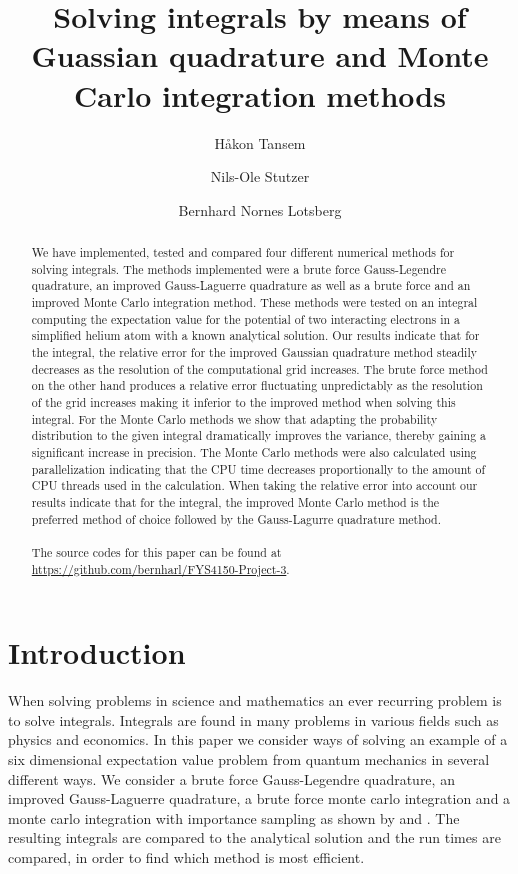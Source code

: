 \documentclass[10pt, twocolumn]{aastex62}
\begin{document}
\title{Solving integrals by means of Guassian quadrature and Monte Carlo integration methods}

\author{Håkon Tansem}

\author{Nils-Ole Stutzer}

\author{Bernhard Nornes Lotsberg}

\begin{abstract}
	We have implemented, tested and compared four different numerical methods
	for solving integrals. The methods implemented were a brute force
	Gauss-Legendre quadrature, an improved Gauss-Laguerre quadrature as well as
	a brute force and an improved Monte Carlo integration method. These methods were
	tested on an integral computing the expectation value for the potential of
	two interacting electrons in a simplified helium atom with a known
	analytical solution. Our results indicate that for the integral, the relative
	error for the improved Gaussian quadrature method steadily decreases as the
	resolution of the computational grid increases. The brute force method on
	the other hand produces a relative error fluctuating unpredictably as the
	resolution of the grid increases making it inferior to the improved method
	when solving this integral. For the Monte Carlo methods we show that adapting the
	probability distribution to the given integral dramatically improves the
	variance, thereby gaining a significant increase in precision. The Monte
	Carlo methods were also calculated using parallelization indicating that the
	CPU time decreases proportionally to the amount of CPU threads used in the
	calculation. When taking the relative error into account our results
	indicate that for the integral, the improved Monte Carlo method is the
	preferred method of choice followed by the Gauss-Lagurre quadrature method. \\\\
	The source codes for this paper can be found at
	\href{https://github.com/bernharl/FYS4150-Project-3}{https://github.com/bernharl/FYS4150-Project-3}.  
	 
\end{abstract}

\section{Introduction} \label{sec:intro}
When solving problems in science and mathematics an ever recurring problem is to
solve integrals. Integrals are found in many problems in various fields such as
physics and economics. In this paper we consider ways of solving an example
of a six dimensional expectation value problem from quantum mechanics
in several different ways. We consider a brute force Gauss-Legendre quadrature,
an improved Gauss-Laguerre quadrature, a brute force monte carlo integration and
a monte carlo integration with importance sampling as shown by \cite{press:2007}
and \cite{jensen:2015}. The resulting integrals are compared to the
analytical solution and the run times are compared, in order to find which
method is most efficient.
\end{document}
